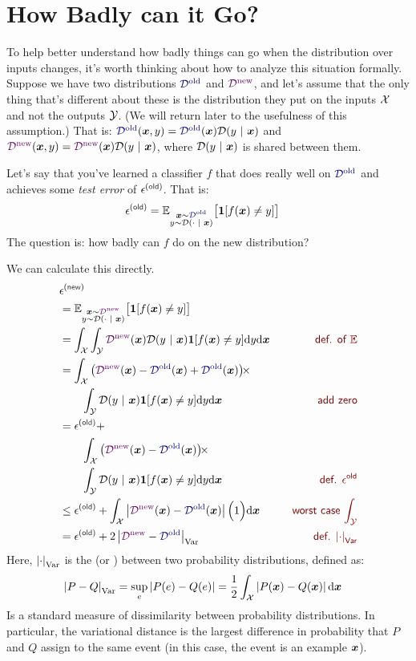 \section{How Badly can it Go?}

To help better understand how badly things can go when the distribution over inputs changes, it's worth thinking about how to analyze this situation formally.
Suppose we have two distributions $\Dold$ and $\Dnew$, and let's assume that the only thing that's different about these is the distribution they put on the inputs $\mathcal{X}$ and not the outputs $\mathcal{Y}$.
(We will return later to the usefulness of this assumption.)
That is: $\Dold(\vx,y) = \Dold(\vx) \cD(y \| \vx)$ and $\Dnew(\vx,y) = \Dnew(\vx) \cD(y \| \vx)$, where $\mathcal{D}(y \textrm{~}\arrowvert\textrm{~} {\boldsymbol{x}})$ is shared between them.

Let's say that you've learned a classifier $f$ that does really well on $\Dold$ and achieves some \emph{test error} of $\ep\xth{old}$.
That is:
%
\begin{align}
  \ep\xth{old} &= \Ep_{\substack{\vx \sim \Dold\\y \sim \cD(\cdot \| \vx)}}\big[ \Ind[f(\vx) \neq y] \big]
\end{align}
%
The question is: how badly can $f$ do on the new distribution?

We can calculate this directly. 
%
\begin{align}
  & \ep\xth{new} \nonumber \\
  &= \Ep_{\substack{\vx \sim \Dnew\\y \sim \cD(\cdot \| \vx)}}\big[ \Ind[f(\vx) \neq y] \big] \\
  &= \int_\cX \int_\cY \Dnew(\vx) \cD(y \| \vx) \Ind[f(\vx) \neq y] \ud y \ud \vx \becauseof{def. of $\Ep$} \\
  &= \int_\cX \left( \Dnew(\vx) - \Dold(\vx) + \Dold(\vx) \right)\times \nonumber\\
& \qquad \int_\cY \cD(y \| \vx) \Ind[f(\vx) \neq y] \ud y \ud \vx  \becauseof{add zero} \\
  &= \ep\xth{old} + \nonumber\\
  &\qquad \int_\cX \left( \Dnew(\vx) - \Dold(\vx)\right) \times \nonumber\\
  &\qquad\int_\cY \cD(y \| \vx) \Ind[f(\vx) \neq y] \ud y \ud \vx  \becauseof{def. $\ep^{\textsf{old}}$} \\
&\leq \ep\xth{old} + \int_\cX \ab{\Dnew(\vx) - \Dold(\vx)} \Big( 1 \Big) \ud \vx  \becauseof{worst case $\int_\cY$} \\
  &= \ep\xth{old} + 2 \ab{\Dnew - \Dold}_{\text{Var}} \becauseof{def. $\ab{\cdot}_{\text{Var}}$}
\end{align}
%
Here, $\left\vert \cdot \right\vert_{\text{Var}}$ is the  (or ) between two probability distributions, defined as:
%
\begin{align}
  \left\vert P - Q \right\vert_{\text{Var}}
  &= \sup_{e} \left\vert P(e) - Q(e) \right\vert
  = \frac 1 2 \int_{\mathcal{X}} \left\vert P({\boldsymbol{x}}) - Q({\boldsymbol{x}}) \right\vert \textrm{d} {\boldsymbol{x}}
\end{align}
%
Is a standard measure of dissimilarity between probability distributions. In particular, the variational distance is the largest difference in probability that $P$ and $Q$ assign to the same event (in this case, the event is an example ${\boldsymbol{x}}$).

